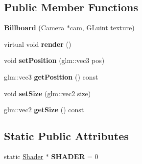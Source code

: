 \subsection*{Public Member Functions}
\begin{DoxyCompactItemize}
\item 
\hypertarget{class_billboard_a41fcebb826ad9e284c633342c673d2cf}{}{\bfseries Billboard} (\hyperlink{class_camera}{Camera} $\ast$cam, G\+Luint texture)\label{class_billboard_a41fcebb826ad9e284c633342c673d2cf}

\item 
\hypertarget{class_billboard_aacd8d0899c6621377217554d7ac0610a}{}virtual void {\bfseries render} ()\label{class_billboard_aacd8d0899c6621377217554d7ac0610a}

\item 
\hypertarget{class_billboard_a2f3e5f1622b813c19cc81393522480a0}{}void {\bfseries set\+Position} (glm\+::vec3 pos)\label{class_billboard_a2f3e5f1622b813c19cc81393522480a0}

\item 
\hypertarget{class_billboard_a8f7bb38b293b16d94126ea5f5860afc7}{}glm\+::vec3 {\bfseries get\+Position} () const \label{class_billboard_a8f7bb38b293b16d94126ea5f5860afc7}

\item 
\hypertarget{class_billboard_a5803ecb146549666442a8d6612efd240}{}void {\bfseries set\+Size} (glm\+::vec2 size)\label{class_billboard_a5803ecb146549666442a8d6612efd240}

\item 
\hypertarget{class_billboard_aad09edf0a72fba9282d3608e9054641d}{}glm\+::vec2 {\bfseries get\+Size} () const \label{class_billboard_aad09edf0a72fba9282d3608e9054641d}

\end{DoxyCompactItemize}
\subsection*{Static Public Attributes}
\begin{DoxyCompactItemize}
\item 
\hypertarget{class_billboard_a4b6c53530979e84c9033c45ffdcaeb70}{}static \hyperlink{class_shader}{Shader} $\ast$ {\bfseries S\+H\+A\+D\+E\+R} = 0\label{class_billboard_a4b6c53530979e84c9033c45ffdcaeb70}

\end{DoxyCompactItemize}

